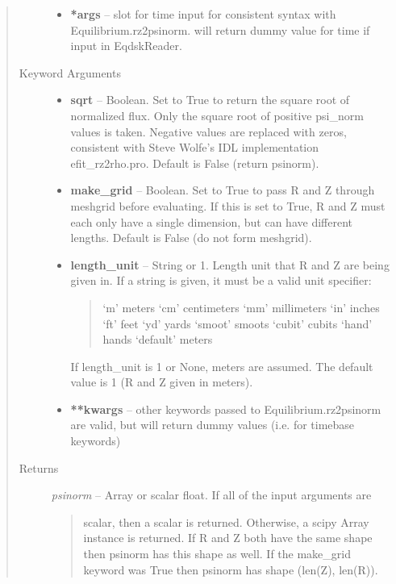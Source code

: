 \documentclass[letterpaper,10pt,english]{sphinxmanual}
\begin{document}
\begin{fulllineitems}
\begin{fulllineitems}
\begin{quote}
\begin{description}
\begin{itemize}
\item {} 
\textbf{*args} --
slot for time input for consistent syntax with Equilibrium.rz2psinorm.
will return dummy value for time if input in EqdskReader.

\end{itemize}

\item[{Keyword Arguments}] \leavevmode\begin{itemize}
\item {} 
\textbf{sqrt} --
Boolean. Set to True to return the square root of normalized
flux. Only the square root of positive psi\_norm values is taken.
Negative values are replaced with zeros, consistent with Steve
Wolfe's IDL implementation efit\_rz2rho.pro. Default is False
(return psinorm).

\item {} 
\textbf{make\_grid} --
Boolean. Set to True to pass R and Z through meshgrid
before evaluating. If this is set to True, R and Z must each
only have a single dimension, but can have different lengths.
Default is False (do not form meshgrid).

\item {} 
\textbf{length\_unit} --
String or 1. Length unit that R and Z are being given
in. If a string is given, it must be a valid unit specifier:
\begin{quote}

`m'         meters
`cm'        centimeters
`mm'        millimeters
`in'        inches
`ft'        feet
`yd'        yards
`smoot'     smoots
`cubit'     cubits
`hand'      hands
`default'   meters
\end{quote}

If length\_unit is 1 or None, meters are assumed. The default
value is 1 (R and Z given in meters).

\item {} 
\textbf{**kwargs} --
other keywords passed to Equilibrium.rz2psinorm are valid,
but will return dummy values (i.e. for timebase keywords)

\end{itemize}

\item[{Returns}] \leavevmode

\emph{psinorm} --
Array or scalar float. If all of the input arguments are
\begin{quote}

scalar, then a scalar is returned. Otherwise, a scipy Array
instance is returned. If R and Z both have the same shape then
psinorm has this shape as well. If the make\_grid keyword was
True then psinorm has shape (len(Z), len(R)).
\end{quote}



\end{description}
\end{quote}
\end{fulllineitems}
\end{fulllineitems}
\end{document}
